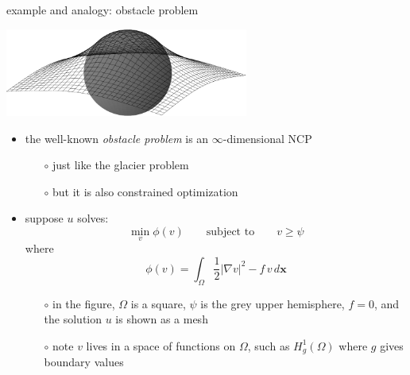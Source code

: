 \documentclass[10pt,hyperref,dvipsnames]{beamer}
\newcommand{\bx}{\mathbf{x}}
\newcommand{\grad}{\nabla}
\begin{document}
\begin{frame}{example and analogy: obstacle problem}

\begin{center}
\includegraphics[width=0.6\textwidth]{figs/obstacle65.pdf}
\end{center}

\begin{itemize}
\item the well-known \emph{obstacle problem} is an $\infty$-dimensional NCP
    \begin{itemize}
    \item[$\circ$] just like the glacier problem
    \item[$\circ$] but it is also constrained optimization
    \end{itemize}
\item suppose $u$ solves:
    $$\min_{v} \phi(v) \qquad \text{subject to} \qquad v \ge \psi$$
where
    $$\phi(v) = \int_\Omega \frac{1}{2} |\grad v|^2 - f\, v\,d\bx$$

    \begin{itemize}
    \item[$\circ$] in the figure, $\Omega$ is a square, $\psi$ is the grey upper hemisphere, $f=0$, and the solution $u$ is shown as a mesh
    \item[$\circ$] note $v$ lives in a space of functions on $\Omega$, such as $H_g^1(\Omega)$ where $g$ gives boundary values
    \end{itemize}
\end{itemize}
\end{frame}
\end{document}
